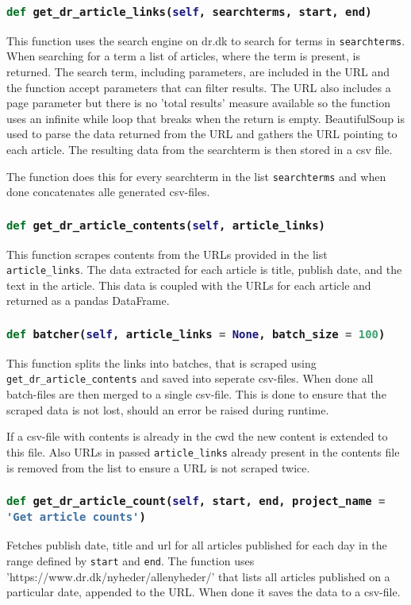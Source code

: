 \documentclass[10pt,a4paper]{article}
\newcommand{\python}{\lstinline[language=Python]}
\begin{document}
		\subsubsection{\python|def get_dr_article_links(self, searchterms, start, end)|}
			This function uses the search engine on dr.dk to search for terms in \python{searchterms}. When searching for a term a list of articles, where the term is present, is returned. The search term, including parameters, are included in the URL and the function accept parameters that can filter results. The URL also includes a page parameter but there is no 'total results' measure available so the function uses an infinite while loop that breaks when the return is empty. BeautifulSoup is used to parse the data returned from the URL and gathers the URL pointing to each article. The resulting data from the searchterm is then stored in a csv file.
			
			The function does this for every searchterm in the list \python {searchterms} and when done concatenates alle generated csv-files.
			
		\subsubsection{\python{def get_dr_article_contents(self, article_links)}}
			This function scrapes contents from the URLs provided in the list \python{article_links}. The data extracted for each article is title, publish date, and the text in the article. This data is coupled with the URLs for each article and returned as a pandas DataFrame.
			
		\subsubsection{\python{def batcher(self, article_links = None, batch_size = 100)}}
			This function splits the links into batches, that is scraped using \python{get_dr_article_contents} and saved into seperate csv-files. When done all batch-files are then merged to a single csv-file. This is done to ensure that the scraped data is not lost, should an error be raised during runtime.
			
			If a csv-file with contents is already in the cwd the new content is extended to this file. Also URLs in passed \python{article_links} already present in the contents file is removed from the list to ensure a URL is not scraped twice.
			
		\subsubsection{\python{def get_dr_article_count(self, start, end, project_name = 'Get article counts')}}
			Fetches publish date, title and url for all articles published for each day in the range defined by \python{start} and \python{end}. The function uses 'https://www.dr.dk/nyheder/allenyheder/' that lists all articles published on a particular date, appended to the URL. When done it saves the data to a csv-file.
\end{document}
